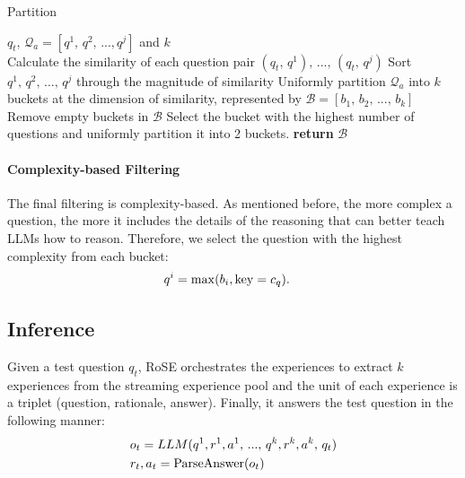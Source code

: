 \documentclass[11pt]{article}
\begin{document}
\begin{algorithm}[t]
\caption{Partition}
\label{alg:partiion}
\begin{algorithmic}[1] %
\REQUIRE $q_t,\,\mathcal{Q}_a = [q^1,\, q^2,\, ..., q^j]$ and $k$\\
\STATE Calculate the similarity of each question pair $(q_t,\, q^1),\, ...,\, (q_t,\, q^j)$
\STATE Sort $q^1, \,q^2,\, ...,\, q^j$ through the magnitude of similarity 
\STATE Uniformly partition $\mathcal{Q}_a$ into $k$ buckets at the dimension of similarity, represented by $\mathcal{B} = [b_1,\, b_2,\, ...,\, b_k]$ 
\STATE Remove empty buckets in $\mathcal{B}$
\STATE Select the bucket with the highest number of questions and uniformly partition it into 2 buckets.
\ENDWHILE
\STATE \textbf{return} $\mathcal{B}$
\end{algorithmic}
\end{algorithm}
   
\paragraph{Complexity-based Filtering} The final filtering is complexity-based. As mentioned before, the more complex a question, the more it includes the details of the reasoning that can better teach LLMs how to reason. Therefore, we select the question with the highest complexity from each bucket:
\begin{align}
q^i &= \max (b_i, {\rm key}=c_{q}).
\end{align}


\subsection{Inference} Given a test question $q_t$, RoSE orchestrates the experiences to extract $k$ experiences from the streaming experience pool and the unit of each experience is a triplet (question, rationale, answer). Finally, it answers the test question in the following manner:
\begin{align}
   & o_t = LLM(q^1, r^1, a^1, \,...,\,q^k, r^k, a^k,\,q_t) \\
   & r_t, a_t = {\rm ParseAnswer}(o_t)
\end{align}
\end{document}
